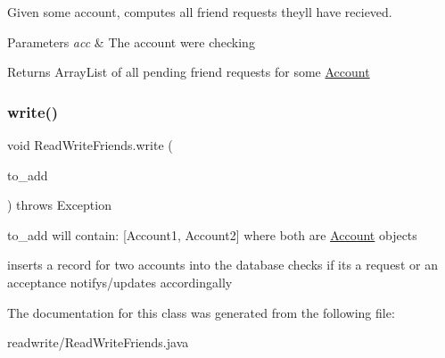 Given some account, computes all friend requests they\textquotesingle{}ll have recieved. 


\begin{DoxyParams}{Parameters}
{\em acc} & The account we\textquotesingle{}re checking \\
\hline
\end{DoxyParams}
\begin{DoxyReturn}{Returns}
Array\+List of all pending friend requests for some \hyperlink{class_account}{Account} 
\end{DoxyReturn}
\mbox{\label{class_read_write_friends_ae754f5aa3e65cde59ad619a56f7b318e}} 
\subsubsection{\texorpdfstring{write()}{write()}}
{\footnotesize\ttfamily void Read\+Write\+Friends.\+write (\begin{DoxyParamCaption}\item[{Array\+List$<$ \hyperlink{class_account}{Account} $>$}]{to\+\_\+add }\end{DoxyParamCaption}) throws Exception}



to\+\_\+add will contain\+: \mbox{[}Account1, Account2\mbox{]} where both are \hyperlink{class_account}{Account} objects 

inserts a record for two accounts into the database checks if it\textquotesingle{}s a request or an acceptance notifys/updates accordingally 

The documentation for this class was generated from the following file\+:\begin{DoxyCompactItemize}
\item 
readwrite/Read\+Write\+Friends.\+java\end{DoxyCompactItemize}
